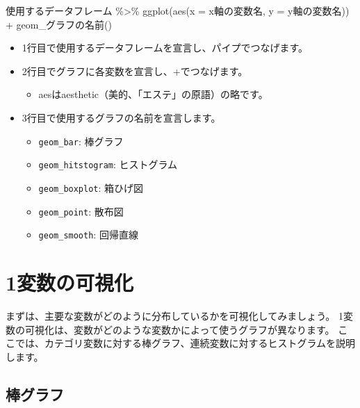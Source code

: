 \documentclass[
]{book}
\newenvironment{Shaded}{\begin{snugshade}}{\end{snugshade}}
\newcommand{\AttributeTok}[1]{\textcolor[rgb]{0.77,0.63,0.00}{#1}}
\newcommand{\FunctionTok}[1]{\textcolor[rgb]{0.00,0.00,0.00}{#1}}
\newcommand{\NormalTok}[1]{#1}
\newcommand{\SpecialCharTok}[1]{\textcolor[rgb]{0.00,0.00,0.00}{#1}}
\providecommand{\tightlist}{%
  \setlength{\itemsep}{0pt}\setlength{\parskip}{0pt}}
\begin{document}
\begin{Shaded}
\begin{Highlighting}[]
\NormalTok{使用するデータフレーム }\SpecialCharTok{\%\textgreater{}\%}
  \FunctionTok{ggplot}\NormalTok{(}\FunctionTok{aes}\NormalTok{(}\AttributeTok{x =}\NormalTok{ x軸の変数名, }\AttributeTok{y =}\NormalTok{ y軸の変数名)) }\SpecialCharTok{+}
\NormalTok{  geom\_グラフの名前()}
\end{Highlighting}
\end{Shaded}

\begin{itemize}
\tightlist
\item
  1行目で使用するデータフレームを宣言し、パイプでつなげます。
\item
  2行目でグラフに各変数を宣言し、+でつなげます。

  \begin{itemize}
  \tightlist
  \item
    aesはaesthetic（美的、「エステ」の原語）の略です。
  \end{itemize}
\item
  3行目で使用するグラフの名前を宣言します。

  \begin{itemize}
  \tightlist
  \item
    \texttt{geom\_bar}: 棒グラフ
  \item
    \texttt{geom\_hitstogram}: ヒストグラム
  \item
    \texttt{geom\_boxplot}: 箱ひげ図
  \item
    \texttt{geom\_point}: 散布図
  \item
    \texttt{geom\_smooth}: 回帰直線
  \end{itemize}
\end{itemize}

\hypertarget{ux5909ux6570ux306eux53efux8996ux5316}{%
\section{1変数の可視化}\label{ux5909ux6570ux306eux53efux8996ux5316}}

まずは、主要な変数がどのように分布しているかを可視化してみましょう。
1変数の可視化は、変数がどのような変数かによって使うグラフが異なります。
ここでは、カテゴリ変数に対する棒グラフ、連続変数に対するヒストグラムを説明します。

\hypertarget{ux68d2ux30b0ux30e9ux30d5}{%
\subsection{棒グラフ}\label{ux68d2ux30b0ux30e9ux30d5}}
\end{document}
